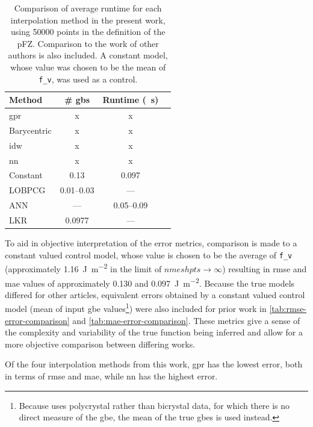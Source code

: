 \documentclass[preprint,12pt]{elsarticle}
\begin{document}
\begin{table}
\caption{Comparison of average runtime for each interpolation method in the present work, using \num{50000} points in the definition of the pFZ. Comparison to the work of other authors is also included. A constant model, whose value was chosen to be the mean of \texttt{f\_v}, was used as a control.}
\centering
\begin{tabular}{lccc}
\toprule
Method & \# \glspl{gb} & Runtime (\SI{}{\second}) \\
\midrule
\Gls{gpr} & x & x \\
Barycentric & x & x \\
\gls{idw} & x & x \\
\gls{nn} & x & x \\
Constant & 0.13 & 0.097 \\
LOBPCG \cite{shenDeterminingGrainBoundary2019} & 0.01--0.03 & --- \\
ANN \cite{echeverrirestrepoUsingArtificialNeural2014} & --- & 0.05--0.09 \\
LKR \cite{chesserLearningGrainBoundary2020} & 0.0977 & --- \\
\bottomrule
\end{tabular}
\label{tab:runtime-comparison}
\end{table}

To aid in objective interpretation of the error metrics, comparison is made to a constant valued control model, whose value is chosen to be the average of \texttt{f\_v} (approximately \SI{1.16}{\J\per\square\meter} in the limit of $nmeshpts \rightarrow \infty$) resulting in \gls{rmse} and \gls{mae} values of approximately \num{0.130} and \SI{0.097}{\J\per\square\meter}. Because the true models differed for other articles, equivalent errors obtained by a constant valued control model (mean of input \gls{gbe} values\footnote{Because \cite{shenDeterminingGrainBoundary2019} uses polycrystal rather than bicrystal data, for which there is no direct measure of the \gls{gbe}, the mean of the true \glspl{gbe} is used instead.}) were also included for prior work in \cref{tab:rmse-error-comparison} and \cref{tab:mae-error-comparison}. These metrics give a sense of the complexity and variability of the true function being inferred and allow for a more objective comparison between differing works.

Of the four interpolation methods from this work, \Gls{gpr} has the lowest error, both in terms of \gls{rmse} and \gls{mae}, while \gls{nn} has the highest error. %
\end{document}
